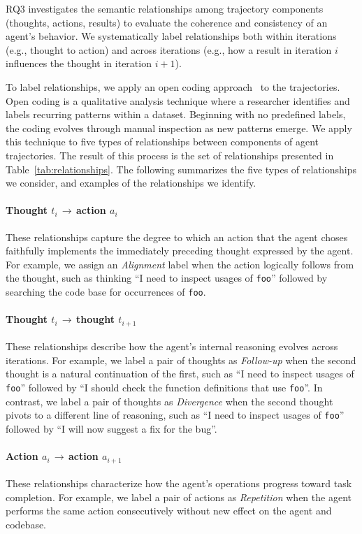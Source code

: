 \documentclass[conference,10pt]{IEEEtran}
\theoremstyle{definition}        %
\begin{document}
RQ3 investigates the semantic relationships among trajectory components (thoughts, actions, results) to evaluate the coherence and consistency of an agent's behavior. We systematically label relationships both within iterations (e.g., thought to action) and across iterations (e.g., how a result in iteration $i$ influences the thought in iteration $i+1$).


To label relationships, we apply an open coding approach~\cite{corbin1990basics} to the trajectories.
Open coding is a qualitative analysis technique where a researcher identifies and labels recurring patterns within a dataset.
Beginning with no predefined labels, the coding evolves through manual inspection as new patterns emerge.
We apply this technique to five types of relationships between components of agent trajectories.
The result of this process is the set of relationships presented in Table~\ref{tab:relationships}.
The following summarizes the five types of relationships we consider, and examples of the relationships we identify.
	

\paragraph{Thought $t_i$\,$\rightarrow$\,action $a_i$}
These relationships capture the degree to which an action that the agent choses faithfully implements the immediately preceding thought expressed by the agent.
For example, we assign an \emph{Alignment} label when the action logically follows from the thought, such as thinking ``I need to inspect usages of \texttt{foo}'' followed by searching the code base for occurrences of \texttt{foo}.

\paragraph{Thought $t_i$\,$\rightarrow$\,thought $t_{i+1}$}
These relationships describe how the agent's internal reasoning evolves across iterations.
For example, we label a pair of thoughts as \emph{Follow-up} when the second thought is a natural continuation of the first, such as ``I need to inspect usages of \texttt{foo}'' followed by ``I should check the function definitions that use \texttt{foo}''.
In contrast, we label a pair of thoughts as \emph{Divergence} when the second thought pivots to a different line of reasoning, such as ``I need to inspect usages of \texttt{foo}'' followed by ``I will now suggest a fix for the bug''.


\paragraph{Action $a_i$\,$\rightarrow$\,action $a_{i+1}$}
These relationships characterize how the agent's operations progress toward task completion.
For example, we label a pair of actions as \emph{Repetition} when the agent performs the same action consecutively without new effect on the agent and codebase.
\end{document}
